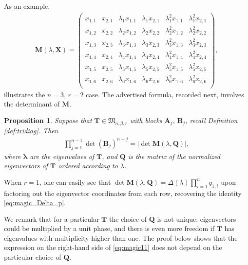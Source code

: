 \documentclass[pdftex]{sigma}
\numberwithin{equation}{section}
\newtheorem{Proposition}[Theorem]{Proposition}
\theoremstyle{definition}
\newcommand{\mbf}[1]{\mathbf{#1}}
\begin{document}
As an example,
\begin{align*}%
 \mbf{M}({\lambda}, \mbf{X})=
 \left(
\begin{array}{cccccc}
 x_{1,1} & x_{2,1} & \lambda_1 x_{1,1} & \lambda_1 x_{2,1} & \lambda_1^2 x_{1,1} & \lambda_1^2 x_{2,1} \\
 x_{1,2} & x_{2,2} & \lambda_2 x_{1,2} & \lambda_2 x_{2,2} & \lambda_2^2 x_{1,2} & \lambda_2^2 x_{2,2} \\
 x_{1,3} & x_{2,3} & \lambda_3 x_{1,3} & \lambda_3 x_{2,3} & \lambda_3^2 x_{1,3} & \lambda_3^2 x_{2,3} \\
 x_{1,4} & x_{2,4} & \lambda_4 x_{1,4} & \lambda_4 x_{2,4} & \lambda_4^2 x_{1,4} & \lambda_4^2 x_{2,4} \\
 x_{1,5} & x_{2,5} & \lambda_5 x_{1,5} & \lambda_5 x_{2,5} & \lambda_5^2 x_{1,5} & \lambda_5^2 x_{2,5} \\
 x_{1,6} & x_{2,6} & \lambda_6 x_{1,6} & \lambda_6 x_{2,6} & \lambda_6^2 x_{1,6} & \lambda_6^2 x_{2,6} \\
\end{array}
\right),
\end{align*}
illustrates the $n=3$, $r=2$ case. The advertised formula, recorded next, involves the determinant of $\mbf{M}$.


\begin{Proposition}\label{prop:magic}
Suppose that $\mbf{T}\in \mathfrak{M}_{n,\beta, r}$ with blocks $\mbf{A}_j$, $\mbf{B}_j$, recall Definition {\rm\ref{def:tridiag}}. Then
\begin{align}\label{eq:magic11}
 \prod_{j=1}^{n-1} \det(\mbf{B}_j)^{n-j}=|{\det \mbf{M}({\lambda}, \mbf{Q})}|,
\end{align}
where $\mbf{\lambda}$ are the eigenvalues of $\mbf{T}$, and $\mbf{Q}$ is the matrix of the normalized eigenvectors of $\mbf{T}$ ordered according to $\lambda$.
\end{Proposition}

When $r=1$, one can easily see that $\det {\mbf{M}(\lambda, \mbf{Q})} = \Delta(\lambda) \prod_{i=1}^n q_{1,i}$ upon factoring out the eigenvector coordinates from each row, recovering the identity \eqref{eq:magic_Delta_p}.

We remark that for a particular $\mbf{T}$ the choice of $\mbf{Q}$ is not unique: eigenvectors could be multiplied by a unit phase, and there is even more freedom if $\mbf{T}$ has eigenvalues with multiplicity higher than one. The proof below shows that the expression on the right-hand side of \eqref{eq:magic11} does not depend on the particular choice of $\mbf{Q}$.
\end{document}
